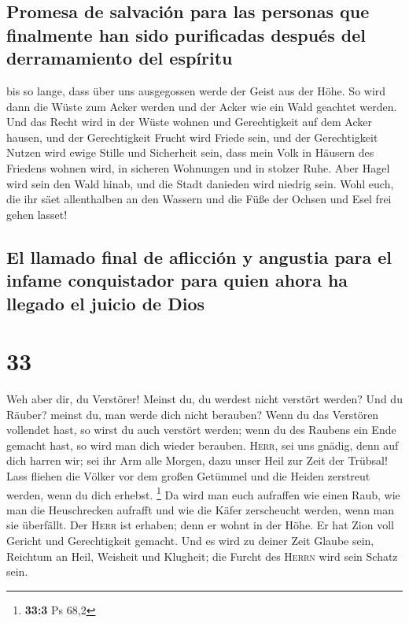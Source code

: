 \hypertarget{promesa-de-salvaciuxf3n-para-las-personas-que-finalmente-han-sido-purificadas-despuuxe9s-del-derramamiento-del-espuxedritu}{%
\subsection{Promesa de salvación para las personas que finalmente han
sido purificadas después del derramamiento del
espíritu}\label{promesa-de-salvaciuxf3n-para-las-personas-que-finalmente-han-sido-purificadas-despuuxe9s-del-derramamiento-del-espuxedritu}}

 bis so lange, dass über uns ausgegossen werde der Geist
aus der Höhe. So wird dann die Wüste zum Acker werden und der Acker wie
ein Wald geachtet werden.  Und das Recht wird in der
Wüste wohnen und Gerechtigkeit auf dem Acker hausen,  und
der Gerechtigkeit Frucht wird Friede sein, und der Gerechtigkeit Nutzen
wird ewige Stille und Sicherheit sein,  dass mein Volk in
Häusern des Friedens wohnen wird, in sicheren Wohnungen und in stolzer
Ruhe.  Aber Hagel wird sein den Wald hinab, und die Stadt
danieden wird niedrig sein.  Wohl euch, die ihr säet
allenthalben an den Wassern und die Füße der Ochsen und Esel frei gehen
lasset!

\hypertarget{el-llamado-final-de-aflicciuxf3n-y-angustia-para-el-infame-conquistador-para-quien-ahora-ha-llegado-el-juicio-de-dios}{%
\subsection{El llamado final de aflicción y angustia para el infame
conquistador para quien ahora ha llegado el juicio de
Dios}\label{el-llamado-final-de-aflicciuxf3n-y-angustia-para-el-infame-conquistador-para-quien-ahora-ha-llegado-el-juicio-de-dios}}

\hypertarget{section-32}{%
\section{33}\label{section-32}}

 Weh aber dir, du Verstörer! Meinst du, du werdest nicht
verstört werden? Und du Räuber? meinst du, man werde dich nicht
berauben? Wenn du das Verstören vollendet hast, so wirst du auch
verstört werden; wenn du des Raubens ein Ende gemacht hast, so wird man
dich wieder berauben.  \textsc{Herr}, sei uns gnädig, denn
auf dich harren wir; sei ihr Arm alle Morgen, dazu unser Heil zur Zeit
der Trübsal!  Lass fliehen die Völker vor dem großen
Getümmel und die Heiden zerstreut werden, wenn du dich erhebst.
\footnote{\textbf{33:3} Ps 68,2}  Da wird man euch
aufraffen wie einen Raub, wie man die Heuschrecken aufrafft und wie die
Käfer zerscheucht werden, wenn man sie überfällt.  Der
\textsc{Herr} ist erhaben; denn er wohnt in der Höhe. Er hat Zion voll
Gericht und Gerechtigkeit gemacht.  Und es wird zu deiner
Zeit Glaube sein, Reichtum an Heil, Weisheit und Klugheit; die Furcht
des \textsc{Herrn} wird sein Schatz sein.

